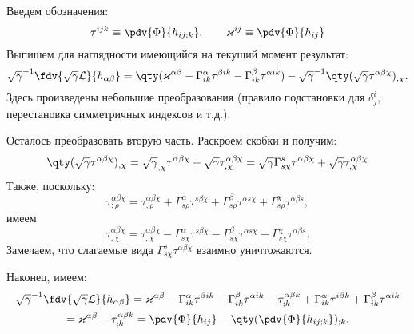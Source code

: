 \documentclass[\docroot/reports/draft/report.tex]{subfiles}
\begin{document}
    Введем обозначения:
    \begin{equation*}
        \tau^{ijk} \equiv \pdv{\Phi}{h_{ij;k}} , \qquad
        \varkappa^{ij} \equiv \pdv{\Phi}{h_{ij}}
    \end{equation*}
    Выпишем для наглядности имеющийся на текущий момент результат:
    \begin{equation*}
        \sqrt{\gamma}^{-1}\fdv{\sqrt{\gamma}\mathcal{L}}{h_{\alpha\beta}} =
            \qty(
                \varkappa^{\alpha\beta}
                - \Gamma^\alpha_{ik} \tau^{\beta i k}
                - \Gamma^\beta_{ik} \tau^{\alpha i k}
            )
            - \sqrt{\gamma}^{-1}\qty(
                \sqrt{\gamma} \tau^{\alpha\beta\chi}
            )_{,\chi} .
    \end{equation*}
    Здесь произведены небольшие преобразования (правило подстановки для $\delta^i_j$, перестановка симметричных индексов и т.д.).

    Осталось преобразовать вторую часть. Раскроем скобки и получим:
    \begin{equation*}
        \qty(\sqrt{\gamma} \tau^{\alpha\beta\chi})_{,\chi} =
            \sqrt{\gamma}_{,\chi} \tau^{\alpha\beta\chi} +
            \sqrt{\gamma} \tau^{\alpha\beta\chi}_{,\chi} =
        \sqrt{\gamma} \Gamma^s_{s \chi} \tau^{\alpha\beta\chi} +
            \sqrt{\gamma} \tau^{\alpha\beta\chi}_{,\chi}
    \end{equation*}
    Также, поскольку:
    \begin{equation*}
        \tau^{\alpha\beta\chi}_{;\rho}
            = \tau^{\alpha\beta\chi}_{,\rho}
            + \Gamma^\alpha_{s \rho} \tau^{s \beta\chi}
            + \Gamma^\beta_{s \rho} \tau^{\alpha s \chi}
            + \Gamma^\chi_{s \rho} \tau^{\alpha\beta s} ,
    \end{equation*}
    имеем
    \begin{equation*}
        \tau^{\alpha\beta\chi}_{,\chi}
            = \tau^{\alpha\beta\chi}_{;\chi}
            - \Gamma^\alpha_{s \chi} \tau^{s \beta\chi}
            - \Gamma^\beta_{s \chi} \tau^{\alpha s \chi}
            - \Gamma^\chi_{s \chi} \tau^{\alpha\beta s} .
    \end{equation*}
    Замечаем, что слагаемые вида $\Gamma^s_{s \chi} \tau^{\alpha\beta\chi}$ взаимно уничтожаются.

    Наконец, имеем:
    \begin{gather*}
        \sqrt{\gamma}^{-1}\fdv{\sqrt{\gamma}\mathcal{L}}{h_{\alpha\beta}} =
            \varkappa^{\alpha\beta}
                - \Gamma^\alpha_{ik} \tau^{\beta ik}
                - \Gamma^\beta_{ik} \tau^{\alpha ik}
            - \tau^{\alpha\beta k}_{; k}
                + \Gamma^\alpha_{ik} \tau^{i \beta k}
                + \Gamma^\beta_{ik} \tau^{\alpha ik} \\
            = \varkappa^{\alpha\beta} - \tau^{\alpha\beta k}_{; k}
            = \pdv{\Phi}{h_{ij}} - \qty(\pdv{\Phi}{h_{ij;k}})_{;k}.
    \end{gather*}
\end{document}
